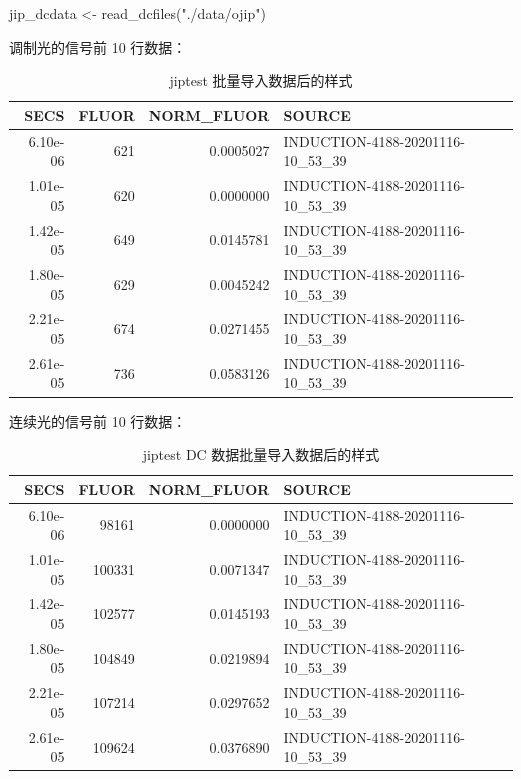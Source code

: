 \documentclass[
]{krantz}
\makeatletter
\newenvironment{Shaded}{\begin{snugshade}}{\end{snugshade}}
\newcommand{\FunctionTok}[1]{\textcolor[rgb]{0.00,0.00,0.00}{#1}}
\newcommand{\NormalTok}[1]{#1}
\newcommand{\OtherTok}[1]{\textcolor[rgb]{0.56,0.35,0.01}{#1}}
\newcommand{\StringTok}[1]{\textcolor[rgb]{0.31,0.60,0.02}{#1}}
\newenvironment{kframe}{%
\medskip{}
\setlength{\fboxsep}{.8em}
 \def\at@end@of@kframe{}%
 \ifinner\ifhmode%
  \def\at@end@of@kframe{\end{minipage}}%
  \begin{minipage}{\columnwidth}%
 \fi\fi%
 \def\FrameCommand##1{\hskip\@totalleftmargin \hskip-\fboxsep
 \colorbox{shadecolor}{##1}\hskip-\fboxsep
     \hskip-\linewidth \hskip-\@totalleftmargin \hskip\columnwidth}%
 \MakeFramed {\advance\hsize-\width
   \@totalleftmargin\z@ \linewidth\hsize
   \@setminipage}}%
 {\par\unskip\endMakeFramed%
 \at@end@of@kframe}
\renewenvironment{Shaded}{\begin{kframe}}{\end{kframe}}
\makeatother
\begin{document}
\begin{Shaded}
\begin{Highlighting}[]
\NormalTok{jip\_dcdata }\OtherTok{\textless{}{-}} \FunctionTok{read\_dcfiles}\NormalTok{(}\StringTok{"./data/ojip"}\NormalTok{)}
\end{Highlighting}
\end{Shaded}

调制光的信号前 10 行数据：

\begin{table}

\caption{\label{tab:unnamed-chunk-52}jiptest 批量导入数据后的样式}
\centering
\begin{tabular}[t]{rrrl}
\toprule
SECS & FLUOR & NORM\_FLUOR & SOURCE\\
\midrule
6.10e-06 & 621 & 0.0005027 & INDUCTION-4188-20201116-10\_53\_39\\
1.01e-05 & 620 & 0.0000000 & INDUCTION-4188-20201116-10\_53\_39\\
1.42e-05 & 649 & 0.0145781 & INDUCTION-4188-20201116-10\_53\_39\\
1.80e-05 & 629 & 0.0045242 & INDUCTION-4188-20201116-10\_53\_39\\
2.21e-05 & 674 & 0.0271455 & INDUCTION-4188-20201116-10\_53\_39\\
\addlinespace
2.61e-05 & 736 & 0.0583126 & INDUCTION-4188-20201116-10\_53\_39\\
\bottomrule
\end{tabular}
\end{table}

连续光的信号前 10 行数据：

\begin{table}

\caption{\label{tab:unnamed-chunk-53}jiptest DC 数据批量导入数据后的样式}
\centering
\begin{tabular}[t]{rrrl}
\toprule
SECS & FLUOR & NORM\_FLUOR & SOURCE\\
\midrule
6.10e-06 & 98161 & 0.0000000 & INDUCTION-4188-20201116-10\_53\_39\\
1.01e-05 & 100331 & 0.0071347 & INDUCTION-4188-20201116-10\_53\_39\\
1.42e-05 & 102577 & 0.0145193 & INDUCTION-4188-20201116-10\_53\_39\\
1.80e-05 & 104849 & 0.0219894 & INDUCTION-4188-20201116-10\_53\_39\\
2.21e-05 & 107214 & 0.0297652 & INDUCTION-4188-20201116-10\_53\_39\\
\addlinespace
2.61e-05 & 109624 & 0.0376890 & INDUCTION-4188-20201116-10\_53\_39\\
\bottomrule
\end{tabular}
\end{table}
\end{document}

